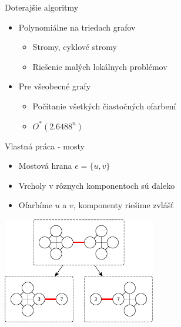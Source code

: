 \documentclass[slovak]{beamer}
\begin{document}
\begin{frame}{Doterajšie algoritmy}
    \begin{itemize}
        \item Polynomiálne na triedach grafov
        \begin{itemize}
            \item Stromy, cyklové stromy
            \item Riešenie malých lokálnych problémov
        \end{itemize}
        \item Pre všeobecné grafy
        \begin{itemize}
            \item Počítanie všetkých čiastočných ofarbení
            \item $O^*(2.6488^n)$
        \end{itemize}
    \end{itemize}
\end{frame}

\begin{frame}{Vlastná práca - mosty}
    \begin{itemize}
        \item Mostová hrana $e = \{u,v\}$
        \item Vrcholy v rôznych komponentoch sú ďaleko
        \item Ofarbíme $u$ a $v$, komponenty riešime zvlášť
    \end{itemize}
    \begin{center}
        \includegraphics[width=0.5\textwidth]{grafy/bridgesplit.pdf}
    \end{center}
\end{frame}
\end{document}
